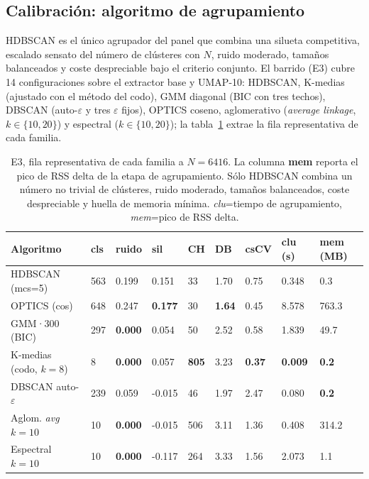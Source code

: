 \subsection{Calibración: algoritmo de agrupamiento}
\label{subsubsec:res-agrupamiento}
HDBSCAN es el único agrupador del panel que combina una silueta competitiva,
escalado sensato del número de clústeres con $N$, ruido moderado, tamaños
balanceados y coste despreciable bajo el criterio conjunto. El barrido (E3)
cubre 14 configuraciones sobre el extractor base y UMAP-10: HDBSCAN, K-medias
(ajustado con el método del codo), GMM diagonal (BIC con tres techos), DBSCAN
(auto-$\varepsilon$ y tres $\varepsilon$ fijos), OPTICS coseno, aglomerativo
(\textit{average linkage}, $k\in\{10, 20\}$) y espectral ($k\in\{10, 20\}$); la
tabla~\ref{tab:e3-summary-6416} extrae la fila representativa de cada familia.

\begin{table}[h]
\caption[E3, fila representativa por familia a $N=6416$]{E3, fila representativa de cada familia a $N=6416$. La columna
\textbf{mem} reporta el pico de RSS delta de la etapa de agrupamiento. Sólo
HDBSCAN combina un número no trivial de clústeres, ruido moderado, tamaños
balanceados, coste despreciable y huella de memoria mínima. \glosacalidad{}
\textit{clu}=tiempo de agrupamiento, \textit{mem}=pico de RSS delta.}
\label{tab:e3-summary-6416}
\centering
{\footnotesize
\begin{tabular}{|p{2.4cm}|p{0.9cm}|p{1.0cm}|p{1.1cm}|p{0.8cm}|p{0.8cm}|p{0.9cm}|p{1.0cm}|p{1.0cm}|} \hline
  \textbf{Algoritmo} & \textbf{cls} & \textbf{ruido} & \textbf{sil} & \textbf{CH} & \textbf{DB} & \textbf{csCV} & \textbf{clu (s)} & \textbf{mem (MB)} \\ \hline
  HDBSCAN (mcs=5)        & 563 & 0.199 &  0.151 &  33 & 1.70 & 0.75 & 0.348 & 0.3 \\ \hline
  OPTICS (cos)           & 648 & 0.247 &  \textbf{0.177} &  30 & \textbf{1.64} & 0.45 & 8.578 & 763.3 \\ \hline
  GMM·300 (BIC)          & 297 & \textbf{0.000} &  0.054 &  50 & 2.52 & 0.58 & 1.839 & 49.7 \\ \hline
  K-medias (codo, $k=8$)   &   8 & \textbf{0.000} &  0.057 & \textbf{805} & 3.23 & \textbf{0.37} & \textbf{0.009} & \textbf{0.2} \\ \hline
  DBSCAN auto-$\varepsilon$ & 239 & 0.059 & -0.015 & 46 & 1.97 & 2.47 & 0.080 & \textbf{0.2} \\ \hline
  Aglom. \textit{avg} $k=10$ &  10 & \textbf{0.000} & -0.015 & 506 & 3.11 & 1.36 & 0.408 & 314.2 \\ \hline
  Espectral $k=10$       &  10 & \textbf{0.000} & -0.117 & 264 & 3.33 & 1.56 & 2.073 & 1.1 \\ \hline
\end{tabular}
}
\end{table}

